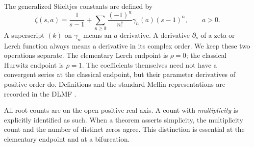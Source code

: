 The generalized Stieltjes constants are defined by
\begin{equation}\label{eq:laurent-convention}
 \zeta(s,a)=\frac1{s-1}+\sum_{n\ge0}
       \frac{(-1)^n}{n!}\gamma_n(a)(s-1)^n,
 \qquad a>0.
\end{equation}
A superscript $(k)$ on $\gamma_n$ means an $a$ derivative. A derivative
$\partial_s$ of a zeta or Lerch function always means a derivative in its
complex order. We keep these two operations separate. The elementary
Lerch endpoint is $\rho=0$; the classical Hurwitz endpoint is $\rho=1$.
The coefficients themselves need not have a convergent series at the
classical endpoint, but their parameter derivatives of positive order do.
Definitions and the standard Mellin representations are recorded in the
DLMF \cite{DLMFHurwitz,DLMFLerch}.

All root counts are on the open positive real axis. A count with
\emph{multiplicity} is explicitly identified as such. When a theorem
asserts simplicity, the multiplicity count and the number of distinct
zeros agree. This distinction is essential at the elementary endpoint
and at a bifurcation.
